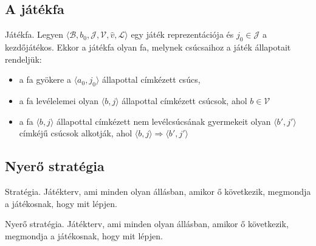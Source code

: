 \subsection{A játékfa}

\begin{definicio}
    Játékfa.
    Legyen $\langle \mathcal{B}, b_0, \mathcal{J}, \mathcal{V}, \hat{v},
    \mathcal{L} \rangle$ egy játék reprezentációja és $j_0 \in \mathcal{J}$ a
    kezdőjátékos. Ekkor a játékfa olyan fa, melynek csúcsaihoz a játék
    állapotait rendeljük:
    \begin{itemize}
        \item a fa gyökere a $\langle a_0, j_0 \rangle$ állapottal címkézett csúcs,
        \item a fa levélelemei olyan $\langle b, j \rangle$ állapottal
            címkézett csúcsok, ahol  $b \in \mathcal{V}$
        \item a fa $\langle b, j \rangle$ állapottal címkézett nem levélcsúcsának
            gyermekeit olyan $\langle b', j' \rangle$ címkéjű csúcsok alkotják, ahol
            $\langle b, j \rangle \Rightarrow \langle b', j' \rangle$
    \end{itemize}
\end{definicio}


\subsection{Nyerő stratégia}

\begin{definicio}
    Stratégia.
    Játékterv, ami minden olyan állásban, amikor ő következik, megmondja a
    játékosnak, hogy mit lépjen.
\end{definicio}

\begin{definicio}
    Nyerő stratégia.
    Játékterv, ami minden olyan állásban, amikor ő következik, megmondja a
    játékosnak, hogy mit lépjen.
\end{definicio}
